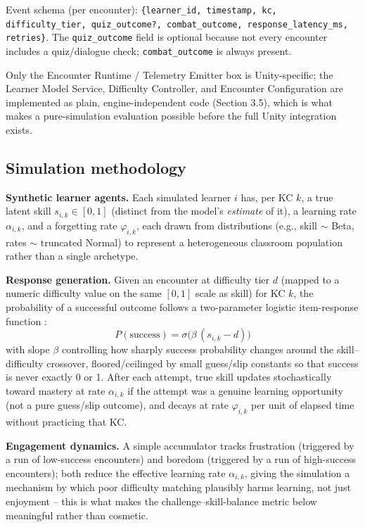 \documentclass[11pt]{article}
\begin{document}
Event schema (per encounter): \texttt{\{learner\_id, timestamp, kc, difficulty\_tier, quiz\_outcome?, combat\_outcome, response\_latency\_ms, retries\}}. The \texttt{quiz\_outcome} field is optional because not every encounter includes a quiz/dialogue check; \texttt{combat\_outcome} is always present.

Only the Encounter Runtime / Telemetry Emitter box is Unity-specific; the Learner Model Service, Difficulty Controller, and Encounter Configuration are implemented as plain, engine-independent code (Section 3.5), which is what makes a pure-simulation evaluation possible before the full Unity integration exists.

\subsection{Simulation methodology}

\textbf{Synthetic learner agents.} Each simulated learner $i$ has, per KC $k$, a true latent skill $s_{i,k} \in [0,1]$ (distinct from the model's \textit{estimate} of it), a learning rate $\alpha_{i,k}$, and a forgetting rate $\varphi_{i,k}$, each drawn from distributions (e.g., skill $\sim$ Beta, rates $\sim$ truncated Normal) to represent a heterogeneous classroom population rather than a single archetype.

\textbf{Response generation.} Given an encounter at difficulty tier $d$ (mapped to a numeric difficulty value on the same $[0,1]$ scale as skill) for KC $k$, the probability of a successful outcome follows a two-parameter logistic item-response function \cite{ref27}:
\begin{equation}
P(\text{success}) = \sigma\big(\beta\,(s_{i,k} - d)\big)
\end{equation}
with slope $\beta$ controlling how sharply success probability changes around the skill--difficulty crossover, floored/ceilinged by small guess/slip constants so that success is never exactly 0 or 1. After each attempt, true skill updates stochastically toward mastery at rate $\alpha_{i,k}$ if the attempt was a genuine learning opportunity (not a pure guess/slip outcome), and decays at rate $\varphi_{i,k}$ per unit of elapsed time without practicing that KC.

\textbf{Engagement dynamics.} A simple accumulator tracks frustration (triggered by a run of low-success encounters) and boredom (triggered by a run of high-success encounters); both reduce the effective learning rate $\alpha_{i,k}$, giving the simulation a mechanism by which poor difficulty matching plausibly harms learning, not just enjoyment -- this is what makes the challenge--skill-balance metric below meaningful rather than cosmetic.
\end{document}
